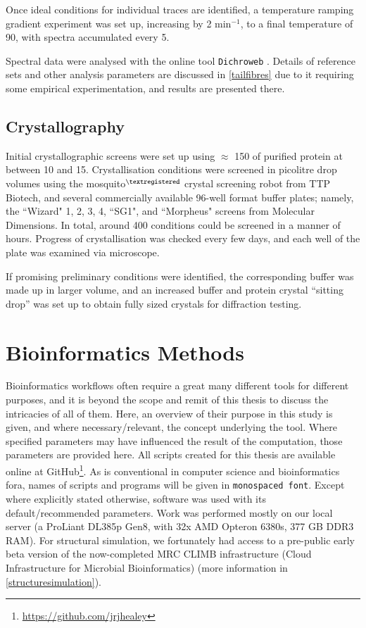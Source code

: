 Once ideal conditions for individual traces are identified, a temperature ramping gradient experiment was set up, increasing by 2\degC{} min$^{-1}$, to a final temperature of 90\degC, with spectra accumulated every 5\degC.

Spectral data were analysed with the online tool \texttt{Dichroweb} \citep{Whitmore2004}. Details of reference sets and other analysis parameters are discussed in \vref{tailfibres} due to it requiring some empirical experimentation, and results are presented there.

\subsection{Crystallography}
Initial crystallographic screens were set up using $\approx$ 150\ul{} of purified protein at between 10 and 15\mgml. Crystallisation conditions were screened in picolitre drop volumes using the mosquito$^{\textregistered}$ crystal screening robot from TTP Biotech, and several commercially available 96-well format buffer plates; namely, the ``Wizard" 1, 2, 3, 4, ``SG1", and ``Morpheus" screens from Molecular Dimensions. In total, around 400 conditions could be screened in a manner of hours. Progress of crystallisation was checked every few days, and each well of the plate was examined via microscope.

If promising preliminary conditions were identified, the corresponding buffer was made up in larger volume, and an increased buffer and protein crystal ``sitting drop'' was set up to obtain fully sized crystals for diffraction testing.

\section{Bioinformatics Methods}
Bioinformatics workflows often require a great many different tools for different purposes, and it is beyond the scope and remit of this thesis to discuss the intricacies of all of them. Here, an overview of their purpose in this study is given, and where necessary/relevant, the concept underlying the tool. Where specified parameters may have influenced the result of the computation, those parameters are provided here. All scripts created for this thesis are available online at GitHub\footnote{\url{https://github.com/jrjhealey}}. As is conventional in computer science and bioinformatics fora, names of scripts and programs will be given in \texttt{monospaced font}. Except where explicitly stated otherwise, software was used with its default/recommended parameters. Work was performed mostly on our local server (a ProLiant DL385p Gen8, with 32x AMD Opteron 6380s, 377 GB DDR3 RAM). For structural simulation, we fortunately had access to a pre-public early beta version of the now-completed MRC CLIMB infrastructure (Cloud Infrastructure for Microbial Bioinformatics)\citep{Connor2016a} (more information in \vref{structuresimulation}).

